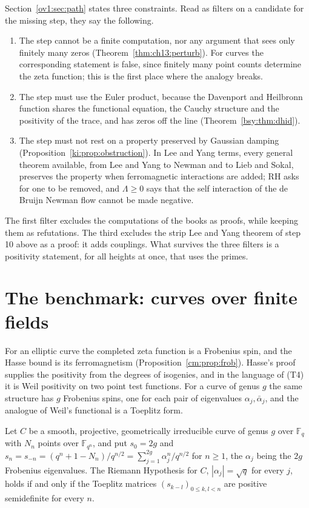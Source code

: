 Section~\ref{ov1:sec:path} states three constraints. Read as filters on a candidate for the missing step, they say the following.

\begin{enumerate}
\item The step cannot be a finite computation, nor any argument that sees only finitely many zeros (Theorem~\ref{thm:ch13:perturb}). For curves the corresponding statement is false, since finitely many point counts determine the zeta function; this is the first place where the analogy breaks.
\item The step must use the Euler product, because the Davenport and Heilbronn function shares the functional equation, the Cauchy structure and the positivity of the trace, and has zeros off the line (Theorem~\ref{bsy:thm:dhid}).
\item The step must not rest on a property preserved by Gaussian damping (Proposition~\ref{ki:prop:obstruction}). In Lee and Yang terms, every general theorem available, from Lee and Yang to Newman and to Lieb and Sokal, preserves the property when ferromagnetic interactions are added; RH asks for one to be removed, and $\Lambda\ge0$ \cite{RodgersTao} says that the self interaction of the de Bruijn Newman flow cannot be made negative.
\end{enumerate}

The first filter excludes the computations of the books as proofs, while keeping them as refutations. The third excludes the strip Lee and Yang theorem of step 10 above as a proof: it adds couplings. What survives the three filters is a positivity statement, for all heights at once, that uses the primes.

\section{The benchmark: curves over finite fields}\label{route:sec:curves}

For an elliptic curve the completed zeta function is a Frobenius spin, and the Hasse bound is its ferromagnetism (Proposition~\ref{cm:prop:frob}). Hasse's proof supplies the positivity from the degrees of isogenies, and in the language of (T4) it is Weil positivity on two point test functions. For a curve of genus $g$ the same structure has $g$ Frobenius spins, one for each pair of eigenvalues $\alpha_j,\bar\alpha_j$, and the analogue of Weil's functional is a Toeplitz form.

\begin{proposition}\label{route:prop:toeplitz}
Let $C$ be a smooth, projective, geometrically irreducible curve of genus $g$ over $\mathbb F_q$ with $N_n$ points over $\mathbb F_{q^n}$, and put $s_0=2g$ and $s_n=s_{-n}=(q^n+1-N_n)/q^{n/2}=\sum_{j=1}^{2g}\alpha_j^n/q^{n/2}$ for $n\ge1$, the $\alpha_j$ being the $2g$ Frobenius eigenvalues. The Riemann Hypothesis for $C$, $|\alpha_j|=\sqrt q$ for every $j$, holds if and only if the Toeplitz matrices $(s_{k-l})_{0\le k,l<n}$ are positive semidefinite for every $n$.
\end{proposition}


